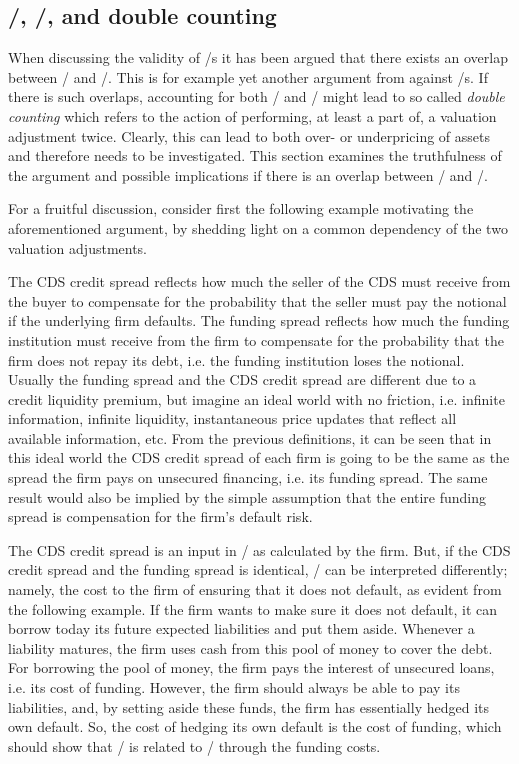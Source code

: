 \documentclass[main.tex]{subfiles}
\begin{document}
    \subsection{\FVA/, \DVA/, and double counting}

    When discussing the validity of \FVA/s it has been argued
    that there exists an overlap between \FVA/ and \DVA/.
    This is for example yet another argument from \textcite{HullWhite2012FVA} against \FVA/s.
    If there is such overlaps, accounting for both \FVA/ and \DVA/
    might lead to so called \textit{double counting}
    which refers to the action of performing, at least a part of, a valuation adjustment twice. 
    Clearly, this can lead to both over- or underpricing of assets
    and therefore needs to be investigated.
    This section examines the truthfulness of the argument and possible implications 
    if there is an overlap between \FVA/ and \DVA/.

    For a fruitful discussion, 
    consider first the following example motivating the aforementioned argument,
    by shedding light on a common dependency of the two valuation adjustments.

    The CDS credit spread reflects how much the seller of the CDS must receive from the buyer
    to compensate for the probability that the seller must pay the notional 
    if the underlying firm defaults.
    The funding spread reflects how much the funding institution must receive from the firm 
    to compensate for the probability that the firm does not repay its debt, 
    i.e. the funding institution loses the notional.
    Usually the funding spread and the CDS credit spread 
    are different due to a credit liquidity premium,
    but imagine an ideal world with no friction, i.e. infinite information, infinite liquidity, 
    instantaneous price updates that reflect all available information, etc.
    From the previous definitions, it can be seen that in this ideal world
    the CDS credit spread of each firm is going to be the same 
    as the spread the firm pays on unsecured financing, i.e. its funding spread.
    The same result would also be implied by the simple assumption 
    that the entire funding spread is compensation for the firm's default risk.

    The CDS credit spread is an input in \DVA/ as calculated by the firm.
    But, if the CDS credit spread and the funding spread is identical, 
    \DVA/ can be interpreted differently;
    namely, the cost to the firm of ensuring that it does not default, 
    as evident from the following example.
    If the firm wants to make sure it does not default,
    it can borrow today its future expected liabilities and put them aside.
    Whenever a liability matures, the firm uses cash from this pool of money to cover the debt.
    For borrowing the pool of money, the firm pays the interest of unsecured loans, 
    i.e. its cost of funding.
    However, the firm should always be able to pay its liabilities,
    and, by setting aside these funds, the firm has essentially hedged its own default. 
    So, the cost of hedging its own default is the cost of funding, 
    which should show that \DVA/ is related to \FVA/ through the funding costs.
    
\end{document}
